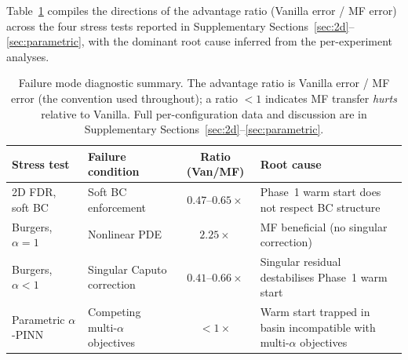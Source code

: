 \documentclass[11pt]{article}
\begin{document}
Table~\ref{tab:failure_modes} compiles the directions of the advantage ratio (Vanilla error / MF error) across the four stress tests reported in Supplementary Sections~\ref{sec:2d}--\ref{sec:parametric}, with the dominant root cause inferred from the per-experiment analyses.

\begin{table}[t]
\centering
\caption{Failure mode diagnostic summary. The advantage ratio is Vanilla error / MF error (the convention used throughout); a ratio $< 1$ indicates MF transfer \emph{hurts} relative to Vanilla. Full per-configuration data and discussion are in Supplementary Sections~\ref{sec:2d}--\ref{sec:parametric}.}
\label{tab:failure_modes}
\small
\begin{tabular}{p{2.5cm}p{3.2cm}cp{4.5cm}}
\toprule
Stress test & Failure condition & Ratio (Van/MF) & Root cause \\
\midrule
2D FDR, soft BC & Soft BC enforcement & $0.47$--$0.65\times$ & Phase~1 warm start does not respect BC structure \\
Burgers, $\alpha = 1$ & Nonlinear PDE & $2.25\times$ & MF beneficial (no singular correction) \\
Burgers, $\alpha < 1$ & Singular Caputo correction & $0.41$--$0.66\times$ & Singular residual destabilises Phase~1 warm start \\
Parametric $\alpha$-PINN & Competing multi-$\alpha$ objectives & $< 1\times$ & Warm start trapped in basin incompatible with multi-$\alpha$ objectives \\
\bottomrule
\end{tabular}
\end{table}



\end{document}
